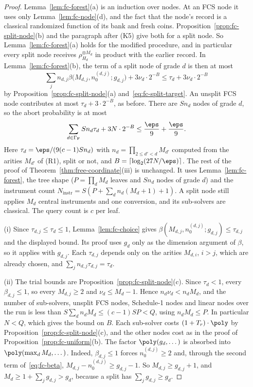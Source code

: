 \begin{proof}
Lemma~\ref{lem:fc-forest}(a) is an induction over nodes. At an FCS node it uses only Lemma~\ref{lem:fc-node}(d), and the fact that the node's record is a classical randomized function of its bank and fresh coins. Proposition~\ref{prop:fc-split-node}(b) and the paragraph after (K5) give both for a split node. So Lemma~\ref{lem:fc-forest}(a) holds for the modified procedure, and in particular every split node receives $\rho_{H_d}^{\otimes M_d}$ in product with the earlier record. In Lemma~\ref{lem:fc-forest}(b), the term of a split node of grade $d$ is then at most
\[
  \sum_jn_{d,j}\beta\bigl(M_{d,j}, n_0^{(d,j)}; g_{d,j}\bigr) + 3\nu_d\cdot 2^{-B} \le \tau_d + 3\nu_d\cdot 2^{-B}
\]
by Proposition~\ref{prop:fc-split-node}(a) and~\eqref{eq:fc-split-target}. An unsplit FCS node contributes at most $\tau_d + 3\cdot 2^{-B}$, as before. There are $Sn_d$ nodes of grade $d$, so the abort probability is at most
\[
  \sum_{d\in\Gamma_{\mathrm F}}Sn_d\tau_d + 3N\cdot 2^{-B} \le \frac{\eps}{9} + \frac{\eps}{9} .
\]
Here $\tau_d = \eps/(9(c-1)Sn_d)$ with $n_d = \prod_{2\le d'<d}M_{d'}$ computed from the arities $M_{d'}$ of (R1), split or not, and $B = \lceil\log_2(27N/\eps)\rceil$. The rest of the proof of Theorem~\ref{thm:free-coordinate}(iii) is unchanged. It uses Lemma~\ref{lem:fc-forest}, the tree shape ($P = \prod_dM_d$ leaves and $Sn_d$ nodes of grade $d$) and the instrument count $N_{\mathrm{instr}} = S(P + \sum_dn_d(M_d+1) + 1)$. A split node still applies $M_d$ central instruments and one conversion, and its sub-solvers are classical. The query count is $c$ per leaf.

(i) Since $\tau_{d,j} \le \tau_d \le 1$, Lemma~\ref{lem:fc-choice} gives $\beta(M_{d,j}, n_0^{(d,j)}; g_{d,j}) \le \tau_{d,j}$ and the displayed bound. Its proof uses $g_d$ only as the dimension argument of $\beta$, so it applies with $g_{d,j}$. Each $\tau_{d,j}$ depends only on the arities $M_{d,i}$, $i > j$, which are already chosen, and $\sum_jn_{d,j}\tau_{d,j} = \tau_d$.

(ii) The trial bounds are Proposition~\ref{prop:fc-split-node}(c). Since $\tau_d < 1$, every $\beta_{d,j} \le 1$, so every $M_{d,j} \ge 2$ and $\nu_d \le M_d - 1$. Hence $n_d\nu_d < n_dM_d$, and the number of sub-solvers, unsplit FCS nodes, Schedule-1 nodes and linear nodes over the run is less than $S\sum_dn_dM_d \le (c-1)SP < Q$, using $n_dM_d \le P$. In particular $N < Q$, which gives the bound on $B$. Each sub-solver costs $(1 + T_r)\cdot\poly$ by Proposition~\ref{prop:fc-split-node}(c), and the other nodes cost as in the proof of Proposition~\ref{prop:fc-uniform}(b). The factor $\poly(g_d,\dots)$ is absorbed into $\poly(\max_dM_d,\dots)$. Indeed, $\beta_{d,j} \le 1$ forces $n_0^{(d,j)} \ge 2$ and, through the second term of~\eqref{eq:fc-beta}, $M_{d,j} - n_0^{(d,j)} \ge g_{d,j} - 1$. So $M_{d,j} \ge g_{d,j} + 1$, and $M_d \ge 1 + \sum_jg_{d,j} > g_d$, because a split has $\sum_jg_{d,j} \ge g_d$.
\end{proof}

